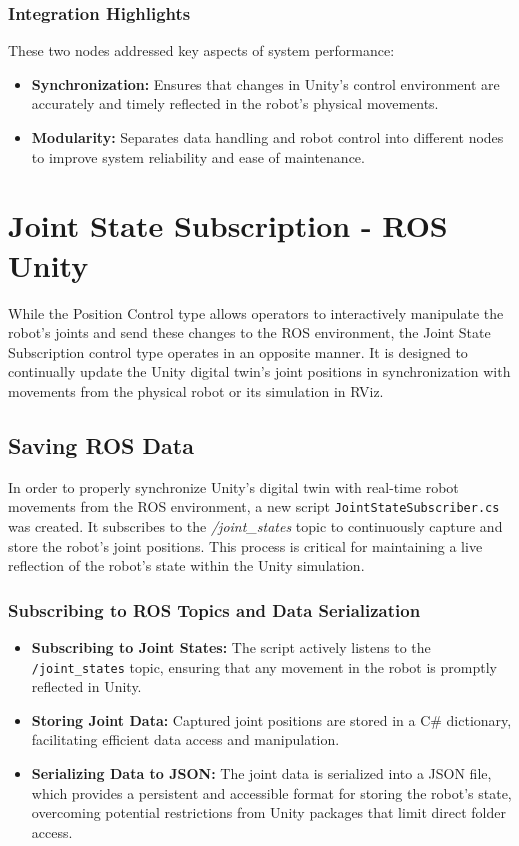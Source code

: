     \subsubsection{Integration Highlights}
    These two nodes addressed key aspects of system performance:
    \begin{itemize}
        \item \textbf{Synchronization:} Ensures that changes in Unity’s control environment are accurately and timely reflected in the robot's physical movements.
        \item \textbf{Modularity:} Separates data handling and robot control into different nodes to improve system reliability and ease of maintenance.
    \end{itemize}




    \section{Joint State Subscription - ROS Unity}

    While the Position Control type allows operators to interactively manipulate the robot's joints and send these changes to the ROS environment, the Joint State Subscription control type operates in an opposite manner. It is designed to continually update the Unity digital twin's joint positions in synchronization with movements from the physical robot or its simulation in RViz. 


    \subsection{Saving ROS Data}
    In order to properly synchronize Unity's digital twin with real-time robot movements from the ROS environment, a new script \texttt{JointStateSubscriber.cs} was created. It subscribes to the \textit{/joint\_states} topic to continuously capture and store the robot's joint positions. This process is critical for maintaining a live reflection of the robot's state within the Unity simulation.
    
    \subsubsection{Subscribing to ROS Topics and Data Serialization}
    \begin{itemize}
        \item \textbf{Subscribing to Joint States:} The script actively listens to the \texttt{/joint\_states} topic, ensuring that any movement in the robot is promptly reflected in Unity.
        \item \textbf{Storing Joint Data:} Captured joint positions are stored in a C\# dictionary, facilitating efficient data access and manipulation.
        \item \textbf{Serializing Data to JSON:} The joint data is serialized into a JSON file, which provides a persistent and accessible format for storing the robot's state, overcoming potential restrictions from Unity packages that limit direct folder access.
    \end{itemize}
    
